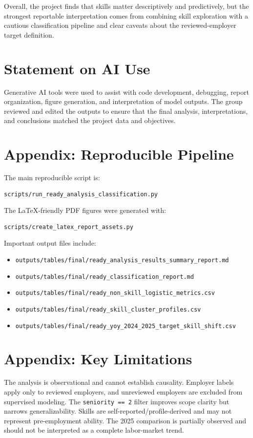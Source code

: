 \documentclass[11pt]{article}
\begin{document}
Overall, the project finds that skills matter descriptively and predictively, but the strongest reportable interpretation comes from combining skill exploration with a cautious classification pipeline and clear caveats about the reviewed-employer target definition.

\section*{Statement on AI Use}

Generative AI tools were used to assist with code development, debugging, report organization, figure generation, and interpretation of model outputs. The group reviewed and edited the outputs to ensure that the final analysis, interpretations, and conclusions matched the project data and objectives.

\appendix

\section{Appendix: Reproducible Pipeline}

The main reproducible script is:

\begin{verbatim}
scripts/run_ready_analysis_classification.py
\end{verbatim}

The LaTeX-friendly PDF figures were generated with:

\begin{verbatim}
scripts/create_latex_report_assets.py
\end{verbatim}

Important output files include:

\begin{itemize}
    \item \texttt{outputs/tables/final/ready\_analysis\_results\_summary\_report.md}
    \item \texttt{outputs/tables/final/ready\_classification\_report.md}
    \item \texttt{outputs/tables/final/ready\_non\_skill\_logistic\_metrics.csv}
    \item \texttt{outputs/tables/final/ready\_skill\_cluster\_profiles.csv}
    \item \texttt{outputs/tables/final/ready\_yoy\_2024\_2025\_target\_skill\_shift.csv}
\end{itemize}

\section{Appendix: Key Limitations}

The analysis is observational and cannot establish causality. Employer labels apply only to reviewed employers, and unreviewed employers are excluded from supervised modeling. The \texttt{seniority == 2} filter improves scope clarity but narrows generalizability. Skills are self-reported/profile-derived and may not represent pre-employment ability. The 2025 comparison is partially observed and should not be interpreted as a complete labor-market trend.
\end{document}
